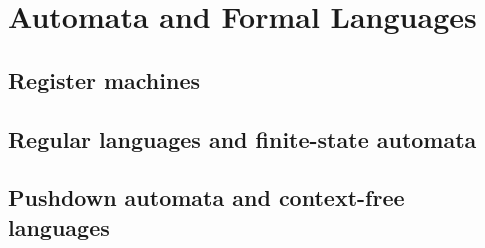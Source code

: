 \documentclass[main.tex]{subfiles}
\begin{document}
	\chapter{Automata and Formal Languages}
		\section{Register machines}
		
		\section{Regular languages and finite-state automata}
		
		\section{Pushdown automata and context-free languages}		
\end{document}

